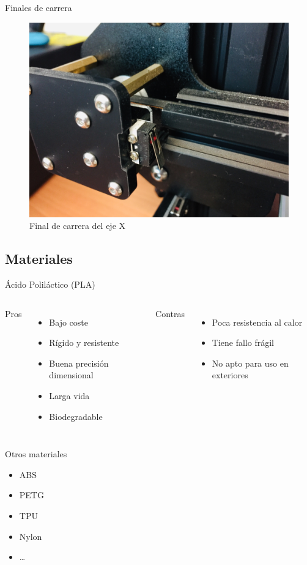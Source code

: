 \documentclass{beamer}
\begin{document}
	\begin{frame}{Finales de carrera}
		\begin{figure}
			\includegraphics[height=0.8\textheight]{images/final}
			\caption{Final de carrera del eje X}
		\end{figure}
	\end{frame}
	
	\subsection{Materiales}
	\begin{frame}{Ácido Poliláctico (PLA)}
		\begin{columns}[T, onlytextwidth]
			Pros
			\begin{itemize}
				\item Bajo coste
				\item Rígido y resistente
				\item Buena precisión dimensional
				\item Larga vida
				\item Biodegradable
			\end{itemize}
			Contras
			\begin{itemize}
				\item Poca resistencia al calor
				\item Tiene fallo frágil
				\item No apto para uso en exteriores
			\end{itemize}
		\end{columns}
	\end{frame}
	\begin{frame}{Otros materiales}
		\begin{itemize}
			\item ABS
			\item PETG
			\item TPU
			\item Nylon
			\item \dots
		\end{itemize}
	\end{frame}
	
\end{document}
